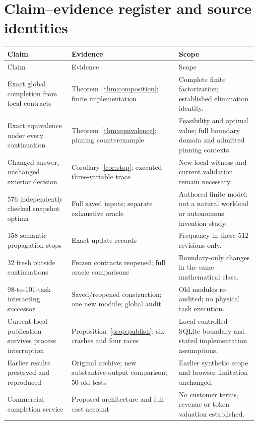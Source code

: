 \documentclass[11pt,letterpaper]{article}
\theoremstyle{definition}\newtheorem{definition}[theorem]{Definition}
\theoremstyle{remark}\newtheorem{remark}[theorem]{Remark}
\begin{document}
\section{Claim--evidence register and source identities}
\label{app:claims}
\begingroup\small
\begin{longtable}{@{}P{.28\linewidth}P{.33\linewidth}P{.32\linewidth}@{}}\toprule
Claim & Evidence & Scope\\\midrule\endfirsthead
\toprule Claim & Evidence & Scope\\\midrule\endhead
Exact global completion from local contracts & Theorem~\ref{thm:composition}; finite implementation & Complete finite factorization; established elimination identity.\\[3pt]
Exact equivalence under every continuation & Theorem~\ref{thm:equivalence}; pinning counterexample & Feasibility and optimal value; full boundary domain and admitted pinning contexts.\\[3pt]
Changed answer, unchanged exterior decision & Corollary~\ref{cor:stop}; executed three-variable trace & New local witness and current validation remain necessary.\\[3pt]
576 independently checked snapshot optima & Full saved inputs; separate exhaustive oracle & Authored finite model; not a natural workload or autonomous invention study.\\[3pt]
158 semantic propagation stops & Exact update records & Frequency in these 512 revisions only.\\[3pt]
32 fresh outside continuations & Frozen contracts reopened; full oracle comparisons & Boundary-only changes in the same mathematical class.\\[3pt]
98-to-101-task interacting successor & Saved/reopened construction; one new module; global audit & Old modules re-audited; no physical task execution.\\[3pt]
Current local publication survives process interruption & Proposition~\ref{prop:publish}; six crashes and four races & Local controlled SQLite boundary and stated implementation assumptions.\\[3pt]
Earlier results preserved and reproduced & Original archive; new substantive-output comparison; 50 old tests & Earlier synthetic scope and browser limitation unchanged.\\[3pt]
Commercial completion service & Proposed architecture and full-cost account & No customer terms, revenue or token valuation established.\\\bottomrule
\end{longtable}
\endgroup
\end{document}
